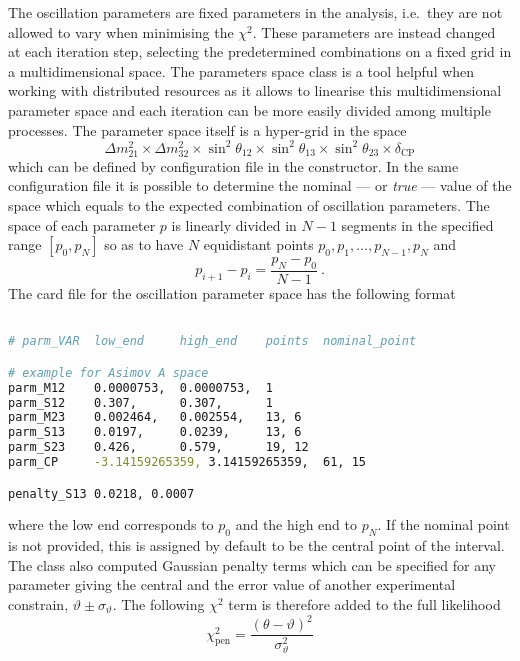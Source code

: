 \documentclass[a4paper, 11pt]{article}
\begin{document}
The oscillation parameters are fixed parameters in the analysis, i.e.\ they are not allowed to vary when minimising the $\chi^2$.
These parameters are instead changed at each iteration step, selecting the predetermined combinations on a fixed grid in %
a multidimensional space.
The parameters space class is a tool helpful when working with distributed resources as it allows to linearise this multidimensional %
parameter space and each iteration can be more easily divided among multiple processes.
The parameter space itself is a hyper-grid in the space
\begin{equation}
	\Delta m^2_{21} \times \Delta m^2_{32} \times \sin^2\theta_{12} \times \sin^2 \theta_{13} \times \sin^2 \theta_{23} \times \delta_\text{CP}
\end{equation}
which can be defined by configuration file in the constructor.
In the same configuration file it is possible to determine the nominal --- or \emph{true} --- value of the space %
which equals to the expected combination of oscillation parameters.
The space of each parameter $p$ is linearly divided in $N-1$ segments in the specified range $[p_0, p_N]$ %
so as to have $N$ equidistant points $p_0, p_1, \ldots, p_{N-1}, p_{N}$ and 
\begin{equation}
	p_{i+1} - p_{i} = \frac{p_{N} - p_0}{N-1}\ .
\end{equation}
The card file for the oscillation parameter space has the following format
\begin{lstlisting}[language=bash]

# parm_VAR	low_end		high_end	points	nominal_point

# example for Asimov A space
parm_M12	0.0000753,	0.0000753,	1	
parm_S12	0.307,		0.307,		1	
parm_M23	0.002464,	0.002554,	13,	6
parm_S13	0.0197,		0.0239,		13,	6
parm_S23	0.426,		0.579,		19,	12
parm_CP		-3.14159265359,	3.14159265359,	61,	15

penalty_S13	0.0218, 0.0007
\end{lstlisting}
where the low end corresponds to $p_0$ and the high end to $p_N$.
If the nominal point is not provided, this is assigned by default to be the central point of the interval.
The class also computed Gaussian penalty terms which can be specified for any parameter giving the central and the error value %
of another experimental constrain, ${\vartheta} \pm \sigma_{{\vartheta}}$.
The following $\chi^2$ term is therefore added to the full likelihood
\begin{equation}
	\chi^2_\text{pen} = \frac{(\theta - {\vartheta})^2}{\sigma_{{\vartheta}}^2}
\end{equation}
\end{document}
